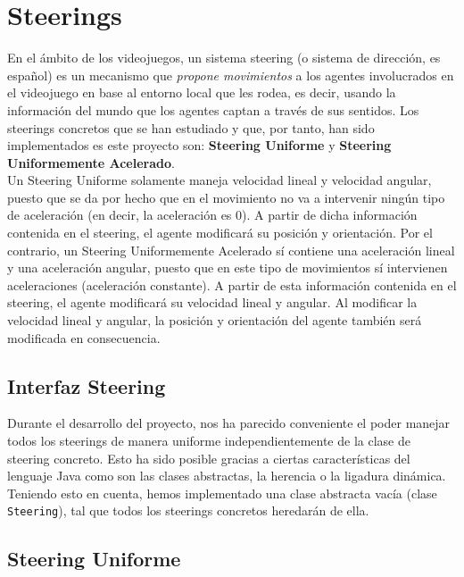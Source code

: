 \medskip
\section{Steerings}
\label{steerings}

En el ámbito de los videojuegos, un sistema steering (o sistema de dirección, es español) es un mecanismo que \textit{propone movimientos} a los agentes involucrados en el videojuego en base al entorno local que les rodea, es decir, usando la información del mundo que los agentes captan a través de sus sentidos. Los steerings concretos que se han estudiado y que, por tanto, han sido implementados es este proyecto son: \textbf{Steering Uniforme} y \textbf{Steering Uniformemente Acelerado}. \\

Un Steering Uniforme solamente maneja velocidad lineal y velocidad angular, puesto que se da por hecho que en el movimiento no va a intervenir ningún tipo de aceleración (en decir, la aceleración es 0). A partir de dicha información contenida en el steering, el agente modificará su posición y orientación. Por el contrario, un Steering Uniformemente Acelerado sí contiene una aceleración lineal y una aceleración angular, puesto que en este tipo de movimientos sí intervienen aceleraciones (aceleración constante). A partir de esta información contenida en el steering, el agente modificará su velocidad lineal y angular. Al modificar la velocidad lineal y angular, la posición y orientación del agente también será modificada en consecuencia. 

\subsection{Interfaz Steering}

Durante el desarrollo del proyecto, nos ha parecido conveniente el poder manejar todos los steerings de manera uniforme independientemente de la clase de steering concreto. Esto ha sido posible gracias a ciertas características del lenguaje Java como son las clases abstractas, la herencia o la ligadura dinámica. Teniendo esto en cuenta, hemos implementado una clase abstracta vacía (clase \texttt{Steering}), tal que todos los steerings concretos heredarán de ella.

\subsection{Steering Uniforme}

